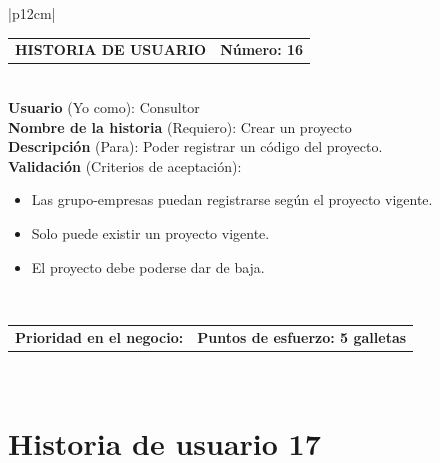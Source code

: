 \documentclass[11pt,letterpaper]{report}
\begin{document}
	\begin{center}	
		\begin{tabular}{|p{12cm}|}
			\hline
			\begin{tabular}{c|c}
				\textbf{HISTORIA DE USUARIO} & \textbf{Número: 16} \\
			\end{tabular} \\ \hline
			\textbf{Usuario} (Yo como): Consultor \\ \hline
			\textbf{Nombre de la historia} (Requiero): Crear un proyecto \\ \hline
			\textbf{Descripción} (Para): Poder registrar un código del proyecto. \\ \hline
			\textbf{Validación} (Criterios de aceptación): \\
			\begin{minipage}{12cm}
				\begin{itemize}
					\item Las grupo-empresas puedan registrarse según el proyecto vigente.
					\item Solo puede existir un proyecto vigente.
					\item El proyecto debe poderse dar de baja.
				\end{itemize}
			\end{minipage} \\ \hline
			\begin{tabular}{p{6cm}|c}
				\textbf{Prioridad en el negocio: } & \textbf{Puntos de esfuerzo: 5 galletas} \\
			\end{tabular} \\ \hline
		\end{tabular}
	\end{center}
	
	\section{Historia de usuario 17}
	
\end{document}
